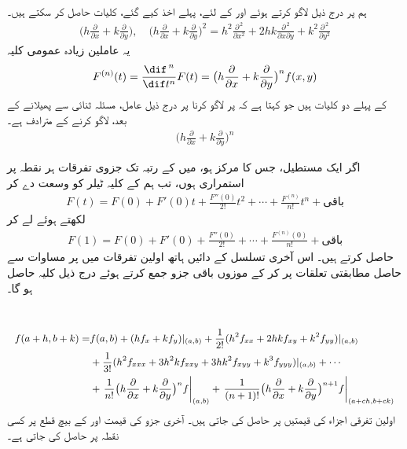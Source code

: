 ہم  پر  درج ذیل   لاگو کرتے ہوئے  اور  کے لئے،   پہلے  اخذ  کیے گئے،  کلیات  حاصل کر سکتے ہیں۔
\begin{align*}
\big(h\frac{\partial}{\partial x}+k\frac{\partial}{\partial y}\big),\quad \big(h\frac{\partial}{\partial x}+k\frac{\partial}{\partial y}\big)^2=h^2\frac{\partial^{\,2}}{\partial x^2}+2hk\frac{\partial^{\,2}}{\partial x\partial y}+k^2\frac{\partial^{\,2}}{\partial y^2}
\end{align*}
یہ عاملین زیادہ عمومی کلیہ
\begin{align}\label{مساوات_کثیرالمتغیر_عمومی_ٹیلر_عاملین}
F^{(n)}(t)=\frac{\dif^{\,n}}{\dif t^n}F(t)=\big(h\frac{\partial}{\partial x}+k\frac{\partial}{\partial y}\big)^nf(x,y)
\end{align}
کے  پہلے  دو کلیات ہیں جو کہتا ہے کہ  پر  لاگو کرنا     پر درج ذیل عامل، مسئلہ ثنائی سے پھیلانے کے بعد،   لاگو کرنے کے مترادف ہے۔
\begin{align*}
\big(h\frac{\partial}{\partial x}+k\frac{\partial}{\partial y}\big)^n
\end{align*}

اگر ایک مستطیل، جس کا مرکز  ہو، میں    کے  رتبہ تک جزوی تفرقات ہر نقطہ پر  استمراری ہوں، تب ہم  کے  کلیہ ٹیلر کو وسعت  دے کر
\begin{align*}
F(t)=F(0)+F'(0)t+\frac{F''(0)}{2!}t^2+\cdots+\frac{F^{(n)}}{n!}t^n+\text{باقی}
\end{align*} 
لکھتے ہوئے   لے کر
\begin{align*}
F(1)=F(0)+F'(0)+\frac{F''(0)}{2!}+\cdots+\frac{F^{(n)}(0)}{n!}+\text{باقی}
\end{align*}
حاصل کرتے ہیں۔ اس آخری  تسلسل   کے  دائیں ہاتھ    اولین  تفرقات میں    پر  مساوات  سے حاصل مطابقتی  تعلقات  پر   کر کے موزوں باقی جزو جمع کرتے ہوئے درج ذیل کلیہ حاصل ہو گا۔

\\
\begin{gather}
{\small{
\begin{aligned}\label{مساوات_کثیرالمتغیر_دو_متغیری_تفاعل_ٹیلر_کلیہ_الف}
f(a+h,b+k)=&f(a,b)+(hf_x+kf_y)\vert_{(a,b)}+\frac{1}{2!}(h^2f_{xx}+2hkf_{xy}+k^2f_{yy})\vert_{(a,b)}\\
&+\frac{1}{3!}(h^2f_{xxx}+3h^2kf_{xxy}+3hk^2f_{xyy}+k^3f_{yyy})\vert_{(a,b)}+\cdots\\
&+\left.\frac{1}{n!}\big(h\frac{\partial}{\partial x}+k\frac{\partial}{\partial y}\big)^nf\right\vert_{(a,b)}+\left.\frac{1}{(n+1)!}\big(h\frac{\partial}{\partial x}+k\frac{\partial}{\partial y}\big)^{n+1}f\right\vert_{(a+ch,b+ck)}
\end{aligned}
}}
\end{gather}
اولین  تفرقی اجزاء کی قیمتیں    پر حاصل کی جاتی ہیں۔ آخری جزو  کی قیمت   اور  کے بیچ قطع پر کسی نقطہ   پر حاصل کی جاتی ہے۔


